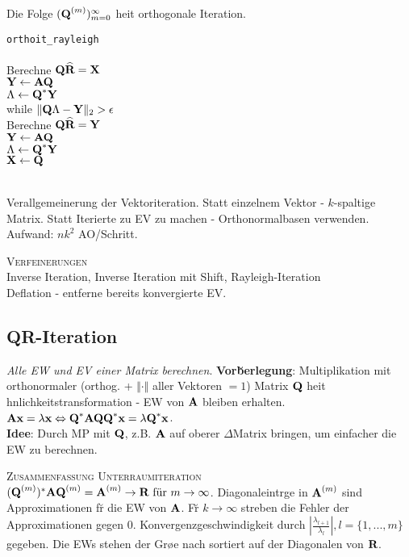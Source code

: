 Die Folge $(\mbox{\bf Q}^{(m)})_{m=0}^\infty$ hei\s t orthogonale Iteration.

\verb!orthoit_rayleigh!\\
{\addtolength{\leftskip}{0mm}
\hrulefill\\
Berechne $\mbox{\bf Q}\widehat{\mbox{\bf R}} = \mbox{\bf X}$ \\
$\mbox{\bf Y} \leftarrow \mbox{\bf AQ}$\\
$\mbox{\bf $\Lambda$} \leftarrow \mbox{\bf Q}^*\mbox{\bf Y}$ \\
while $\Vert \mbox{\bf Q$\Lambda$} - \mbox{\bf Y} \Vert_2 > \epsilon$ \\
\quad Berechne $\mbox{\bf Q}\widehat{\mbox{\bf R}} = \mbox{\bf Y}$ \\
\quad $\mbox{\bf Y} \leftarrow \mbox{\bf AQ}$\\
\quad $\mbox{\bf $\Lambda$} \leftarrow \mbox{\bf Q}^*\mbox{\bf Y}$ \\
$\mbox{\bf X} \leftarrow \mbox{\bf Q}$ \\
\hrulefill\\
}

Verallgemeinerung der Vektoriteration. Statt einzelnem Vektor - $k$-spaltige Matrix. Statt Iterierte zu EV zu machen - Orthonormalbasen verwenden.\\
Aufwand: $nk^2$ AO/Schritt. \vspace{0.2cm}

\textsc{Verfeinerungen}\\
Inverse Iteration, Inverse Iteration mit Shift, Rayleigh-Iteration\\
Deflation - entferne bereits konvergierte EV.

\subsection{QR-Iteration}
\emph{Alle EW und EV einer Matrix berechnen}.
\textbf{Vor\u berlegung}:
Multiplikation mit orthonormaler (orthog. + $\Vert\cdot\Vert$ aller Vektoren $=1$) Matrix $\mbox{\bf Q}$ hei\s t \A hnlichkeitstransformation - EW von $\mbox{\bf A}$ bleiben erhalten. $\mbox{\bf Ax} =\lambda \mbox{\bf x} \Leftrightarrow \mbox{\bf Q}^*\mbox{\bf AQQ}^*\mbox{\bf x}= \lambda \mbox{\bf Q}^* \mbox{\bf x}$.\\
\textbf{Idee}: Durch MP mit $\mbox{\bf Q}$, z.B. $\mbox{\bf A}$ auf oberer $\Delta$Matrix bringen, um einfacher die EW zu berechnen.\vspace{0.2cm}

\textsc{Zusammenfassung Unterraumiteration}\\
$(\mbox{\bf Q}^{(m)})^*\mbox{\bf A}\mbox{\bf Q}^{(m)} = \mbox{\bf A}^{(m)} \rightarrow \mbox{\bf R} \text{ f\"{u}r } m \rightarrow \infty$. Diagonaleintr\a ge in $\mbox{\bf A}^{(m)}$ sind Approximationen f\u r die EW von $\mbox{\bf A}$. F\u r $k \rightarrow \infty$ streben die Fehler der Approximationen gegen 0. Konvergenzgeschwindigkeit durch $\left|\frac{\lambda_{l+1}}{\lambda_l}\right|, l=\{1,...,m\}$ gegeben. Die EWs stehen der Gr\o \s e nach sortiert auf der Diagonalen von $\mbox{\bf R}$.\vspace{0.2cm}

